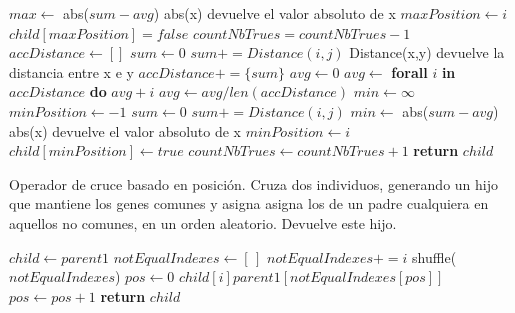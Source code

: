 \begin{algorithm}[H]
\begin{algorithmic}
                \State
                    \State $max \leftarrow$ abs($sum - avg$) \Comment abs(x) devuelve el valor absoluto de x
                    \State $maxPosition \leftarrow i$
                \EndIf
            \EndIf
        \EndFor
        \State
        \State $child[maxPosition] = false$
        \State $countNbTrues = countNbTrues - 1$
    \EndWhile
    \State
        \State $accDistance \leftarrow []$
            \State $sum \leftarrow 0$
                    \State $sum += Distance(i,j)$ \Comment Distance(x,y) devuelve la distancia entre x e y
                \EndIf
                \State $accDistance += \{sum\}$
            \EndFor
        \EndFor
        \State
        \State $avg \leftarrow 0$
        \State $avg \leftarrow $ \textbf{forall} $i$ \textbf{in} $accDistance$ \textbf{do} $avg + i$
        \State $avg \leftarrow avg / len(accDistance)$
        \State
        \State $min \leftarrow \infty$
        \State $minPosition \leftarrow -1$
                \State $sum \leftarrow 0$
                \State
                    \State $sum += Distance(i,j)$
                \EndFor
                \State
                    \State $min \leftarrow$ abs($sum - avg$) \Comment abs(x) devuelve el valor absoluto de x
                    \State $minPosition \leftarrow i$
                \EndIf
            \EndIf
        \EndFor
        \State
        \State $child[minPosition] \leftarrow true$
        \State $countNbTrues \leftarrow countNbTrues + 1$
    \EndWhile
    \State \textbf{return} $child$
\EndProcedure
\end{algorithmic}
\end{algorithm}

\begin{algorithm}[H]
    \caption{Operador de cruce basado en posición. Cruza dos individuos, generando un hijo que mantiene los genes comunes y asigna asigna los de un padre cualquiera en aquellos no comunes, en un orden aleatorio. Devuelve este hijo.}
\begin{algorithmic}
    \State $child \leftarrow parent1$
    \State
    \State $notEqualIndexes \leftarrow [ \, ]$
            \State $notEqualIndexes += {i}$
        \EndIf
    \EndFor
    \State
    \State shuffle($notEqualIndexes$)
    \State $pos \leftarrow 0$
            \State $child[i] parent1[notEqualIndexes[pos]]$
            \State $pos \leftarrow pos + 1$
        \EndIf
    \EndFor
    \State \textbf{return} $child$
\EndProcedure
\end{algorithmic}
\end{algorithm}


